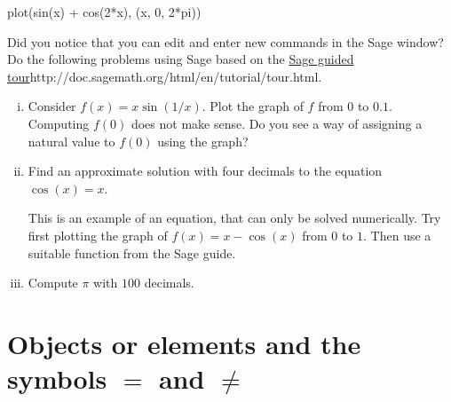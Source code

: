 \documentclass{article}
\begin{document}
\begin{sage}
plot(sin(x) + cos(2*x), (x, 0, 2*pi))
\end{sage}


\beginshex
Did you notice that you can edit and enter new commands in the Sage window?
Do the following problems using Sage based on the \url{Sage guided tour}{http://doc.sagemath.org/html/en/tutorial/tour.html}. 

\begin{enumerate}[(i)]
\item Consider $f(x) = x \sin(1/x)$. Plot the graph of $f$ from $0$ to $0.1$. Computing $f(0)$ does not make sense. Do you
  see a way of assigning a natural value to $f(0)$ using the graph?
\item Find an approximate solution with four decimals to the equation $\cos(x) = x$.
  
  \begin{hint}[showhide]
    This is an example of an equation, that can only be solved numerically.
    Try first plotting the graph of $f(x) = x - \cos(x)$ from $0$ to $1$. Then use a
    suitable function from the Sage guide.
    \end{hint}
\item Compute $\pi$ with $100$ decimals.
\end{enumerate}
  
\endshex








\section{Objects or elements and the symbols $=$ and $\neq$}
\end{document}
